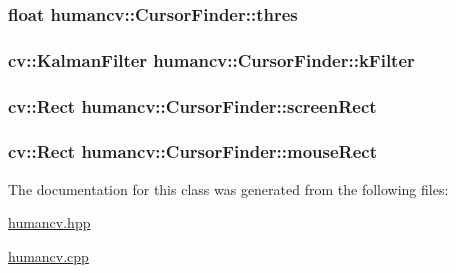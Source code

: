 \hypertarget{classhumancv_1_1_cursor_finder_a77b21640a4c7c1f24da2e39c9ae1a4a7}{
\subsubsection[{thres}]{\setlength{\rightskip}{0pt plus 5cm}float {\bf humancv\-::\-Cursor\-Finder\-::thres}}}\label{classhumancv_1_1_cursor_finder_a77b21640a4c7c1f24da2e39c9ae1a4a7}
\hypertarget{classhumancv_1_1_cursor_finder_af55f31c83c5a619205455801ead7ec73}{
\subsubsection[{k\-Filter}]{\setlength{\rightskip}{0pt plus 5cm}cv\-::\-Kalman\-Filter {\bf humancv\-::\-Cursor\-Finder\-::k\-Filter}}}\label{classhumancv_1_1_cursor_finder_af55f31c83c5a619205455801ead7ec73}
\hypertarget{classhumancv_1_1_cursor_finder_a8a6474e4cf616789f7b14085e83261c8}{
\subsubsection[{screen\-Rect}]{\setlength{\rightskip}{0pt plus 5cm}cv\-::\-Rect {\bf humancv\-::\-Cursor\-Finder\-::screen\-Rect}}}\label{classhumancv_1_1_cursor_finder_a8a6474e4cf616789f7b14085e83261c8}
\hypertarget{classhumancv_1_1_cursor_finder_ac24299e06cd5d271dac727a80bebc5c3}{
\subsubsection[{mouse\-Rect}]{\setlength{\rightskip}{0pt plus 5cm}cv\-::\-Rect {\bf humancv\-::\-Cursor\-Finder\-::mouse\-Rect}}}\label{classhumancv_1_1_cursor_finder_ac24299e06cd5d271dac727a80bebc5c3}


The documentation for this class was generated from the following files\-:\begin{DoxyCompactItemize}
\item 
\hyperlink{humancv_8hpp}{humancv.\-hpp}\item 
\hyperlink{humancv_8cpp}{humancv.\-cpp}\end{DoxyCompactItemize}
